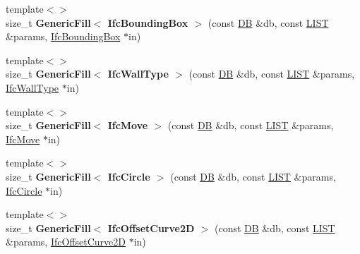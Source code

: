 \begin{DoxyCompactItemize}
\item 
\hypertarget{namespace_assimp_1_1_s_t_e_p_a322c69311da177ff8257fbfa234189d4}{{\footnotesize template$<$$>$ }\\size\+\_\+t {\bfseries Generic\+Fill$<$ Ifc\+Bounding\+Box $>$} (const \hyperlink{class_assimp_1_1_s_t_e_p_1_1_d_b}{D\+B} \&db, const \hyperlink{class_assimp_1_1_s_t_e_p_1_1_e_x_p_r_e_s_s_1_1_l_i_s_t}{L\+I\+S\+T} \&params, \hyperlink{struct_assimp_1_1_i_f_c_1_1_ifc_bounding_box}{Ifc\+Bounding\+Box} $\ast$in)}\label{namespace_assimp_1_1_s_t_e_p_a322c69311da177ff8257fbfa234189d4}

\item 
\hypertarget{namespace_assimp_1_1_s_t_e_p_a5ed4bcee6a9595f1734ab82b0c3ea939}{{\footnotesize template$<$$>$ }\\size\+\_\+t {\bfseries Generic\+Fill$<$ Ifc\+Wall\+Type $>$} (const \hyperlink{class_assimp_1_1_s_t_e_p_1_1_d_b}{D\+B} \&db, const \hyperlink{class_assimp_1_1_s_t_e_p_1_1_e_x_p_r_e_s_s_1_1_l_i_s_t}{L\+I\+S\+T} \&params, \hyperlink{struct_assimp_1_1_i_f_c_1_1_ifc_wall_type}{Ifc\+Wall\+Type} $\ast$in)}\label{namespace_assimp_1_1_s_t_e_p_a5ed4bcee6a9595f1734ab82b0c3ea939}

\item 
\hypertarget{namespace_assimp_1_1_s_t_e_p_aedef464d46a307e0163839d9039f3ab7}{{\footnotesize template$<$$>$ }\\size\+\_\+t {\bfseries Generic\+Fill$<$ Ifc\+Move $>$} (const \hyperlink{class_assimp_1_1_s_t_e_p_1_1_d_b}{D\+B} \&db, const \hyperlink{class_assimp_1_1_s_t_e_p_1_1_e_x_p_r_e_s_s_1_1_l_i_s_t}{L\+I\+S\+T} \&params, \hyperlink{struct_assimp_1_1_i_f_c_1_1_ifc_move}{Ifc\+Move} $\ast$in)}\label{namespace_assimp_1_1_s_t_e_p_aedef464d46a307e0163839d9039f3ab7}

\item 
\hypertarget{namespace_assimp_1_1_s_t_e_p_a6ffbc6e9f29e7d37f6c3271e053ab711}{{\footnotesize template$<$$>$ }\\size\+\_\+t {\bfseries Generic\+Fill$<$ Ifc\+Circle $>$} (const \hyperlink{class_assimp_1_1_s_t_e_p_1_1_d_b}{D\+B} \&db, const \hyperlink{class_assimp_1_1_s_t_e_p_1_1_e_x_p_r_e_s_s_1_1_l_i_s_t}{L\+I\+S\+T} \&params, \hyperlink{struct_assimp_1_1_i_f_c_1_1_ifc_circle}{Ifc\+Circle} $\ast$in)}\label{namespace_assimp_1_1_s_t_e_p_a6ffbc6e9f29e7d37f6c3271e053ab711}

\item 
\hypertarget{namespace_assimp_1_1_s_t_e_p_a54b0b9d8ec6f6614c2ed884cb0f77e42}{{\footnotesize template$<$$>$ }\\size\+\_\+t {\bfseries Generic\+Fill$<$ Ifc\+Offset\+Curve2\+D $>$} (const \hyperlink{class_assimp_1_1_s_t_e_p_1_1_d_b}{D\+B} \&db, const \hyperlink{class_assimp_1_1_s_t_e_p_1_1_e_x_p_r_e_s_s_1_1_l_i_s_t}{L\+I\+S\+T} \&params, \hyperlink{struct_assimp_1_1_i_f_c_1_1_ifc_offset_curve2_d}{Ifc\+Offset\+Curve2\+D} $\ast$in)}\label{namespace_assimp_1_1_s_t_e_p_a54b0b9d8ec6f6614c2ed884cb0f77e42}


\end{DoxyCompactItemize}
